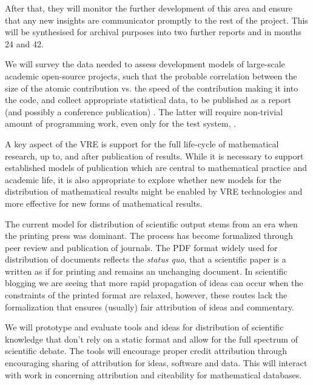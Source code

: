 \begin{workpackage}[id=social-aspects,wphases=0-48,
  title=Social Aspects,
  lead=UO,
  UORM=23,USHRM=18,USORM=6]
\begin{tasklist}
\begin{task}[title=Social Science Input to
    Design,id=social-input,lead=UO,PM=18, partners={UO,PS}]
After that, they will monitor the further development of this area and
ensure that any new insights are communicator promptly to the rest of
the project. This will be synthesised for archival purposes into two
further reports 
 and 
 in months 24 and 42.

We will survey the data needed to assess development models of
large-scale academic open-source projects, such that the probable
correlation between the size of the atomic contribution vs. the speed
of the contribution making it into the code, and collect appropriate
statistical data, to be published as a report (and possibly a conference
publication) . 
The latter will require non-trivial amount of
programming work, even only for the test system, \Sage.
\end{task}

\begin{task}[title=Implications of VREs for Publication,id=social-output,lead=USH,PM=12,partners={UO}]
  A key aspect of the \TheProject VRE is support for the full
  life-cycle of mathematical research, up to, and after publication of
  results. While it is necessary to support established models of
  publication which are central to mathematical practice and academic
  life, it is also appropriate to explore whether new models for the
  distribution of mathematical results might be enabled by VRE
  technologies and more effective for new forms of mathematical
  results.

  The current model for distribution of scientific output stems from
  an era when the printing press was dominant. The process has become
  formalized through peer review and publication of journals. The PDF
  format widely used for distribution of documents reflects the
  \textit{status quo}, that a scientific paper is a written as if for
  printing and remains an unchanging document. In scientific blogging
  we are seeing that more rapid propagation of ideas can occur when
  the constraints of the printed format are relaxed, however, these
  routes lack the formalization that ensures (usually) fair
  attribution of ideas and commentary.

  We will prototype and evaluate tools and ideas for distribution of
  scientific knowledge that don't rely on a static format and allow
  for the full spectrum of scientific debate.  The tools will
  encourage proper credit attribution through encouraging sharing of
  attribution for ideas, software and data. This will interact with
  work in  concerning attribution and citeability for
  mathematical databases.


\end{task}
\end{tasklist}
\end{workpackage}
